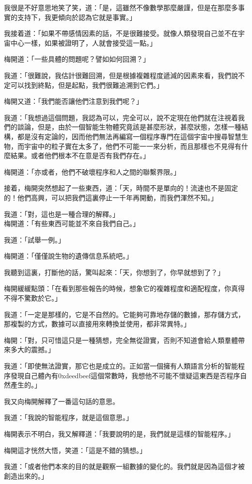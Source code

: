 我很是不好意思地笑了笑，道：「是，這雖然不像數學那麼嚴謹，但是在那麼多事實的支持下，我更傾向於認為它就是事實。」

我接着道：「如果不帶感情因素的話，不是很難接受。就像人類發現自己並不在宇宙中心一樣，如果被證明了，人就會接受這一點。」

梅開道：「一些具體的問題呢？譬如如何回溯？」

我道：「很難說，我估計很難回溯，但是根據複雜程度遞減的因素來看，我們說不定可以找到終點，但是起點，我們很難追溯到它們。」

梅開又道：「我們能否讓他們注意到我們呢？」

我道：「我想過這個問題，我認為可以，完全可以，說不定現在他們就在注視着我們的談論，但是，由於一個智能生物體究竟該是甚麼形狀，甚麼狀態，怎樣一種結構，都是沒有定論的，因而他們無法再編寫一個程序專門在這個宇宙中搜尋智慧生物，而宇宙中的粒子實在太多了，他們不可能一一來分析，而且那樣也不見得有什麼結果。或者他們根本不在意是否有我們存在。」

梅開道：「亦或者，他們不破壞程序和人之間的聯繫界限。」

接着，梅開突然想起了一些東西，道：「天，時間不是單向的！流速也不是固定的！他們高興，可以把我們這裏停止一千年再開動，而我們渾然不知。」

我道：「對，這也是一種合理的解釋。」
\\


梅開道：「有些東西可能並不來自我們自己。」

我道：「試舉一例。」

梅開道：「僅僅說生物的遺傳信息系統吧。」

我聽到這裏，打斷他的話，驚叫起來：「天，你想到了，你早就想到了？」

梅開緩緩點頭：「在看到那些報告的時候，想象它的複雜程度和適配程度，你真得不得不驚歎於它。」

我道：「一定是那樣的，它是不自然的。它能夠可靠地存儲的數據，那存儲方式，那複製的方式，數據可以直接用來轉換並使用，都非常異特。」

梅開：「對，只可惜這只是一種猜想，完全無從證實，否則不知道會給人類羣體帶來多大的震撼。」

我道：「即使無法證實，那它也是成立的。正如當一個擁有人類語言分析的智能程序發現自己體內有0xdeedbeef這個常數時，我想他不可能不懷疑這東西是否程序自然產生的。」


我又向梅開解釋了一番這句話的意思。

我道：「我說的智能程序，就是這個意思。」

梅開表示不明白，我又解釋道：「我要說明的是，我們就是這樣的智能程序。」

梅開這才恍然大悟，笑道：「這是不錯的猜想。」

我道：「或者他們本來的目的就是觀察一組數據的變化的。我們就是因為這個才被創造出來的。」

